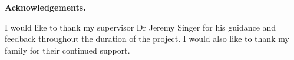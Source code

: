 \documentclass{mpaper}
\begin{document}


    \vskip8pt \noindent
    \textbf{Acknowledgements.}
    
    I would like to thank my supervisor Dr Jeremy Singer for his guidance and feedback throughout the duration of the project.
    I would also like to thank my family for their continued support.

    
    
\end{document}
